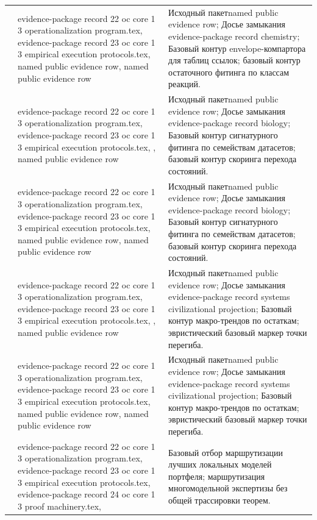 \begin{longtable}{@{}L{0.16\textwidth}L{0.38\textwidth}L{0.34\textwidth}@{}}
 & evidence-package record 22 oc core 1 3 operationalization program.tex, \allowbreak evidence-package record 23 oc core 1 3 empirical execution protocols.tex, named public evidence row, named public evidence row & Исходный пакетnamed public evidence row; Досье замыкания evidence-package record chemistry; Базовый контур envelope-компартора для таблиц ссылок; базовый контур остаточного фитинга по классам реакций. \\
 & evidence-package record 22 oc core 1 3 operationalization program.tex, \allowbreak evidence-package record 23 oc core 1 3 empirical execution protocols.tex, \allowbreak {}, named public evidence row & Исходный пакетnamed public evidence row; Досье замыкания evidence-package record biology; Базовый контур сигнатурного фитинга по семействам датасетов; базовый контур скоринга перехода состояний. \\
 & evidence-package record 22 oc core 1 3 operationalization program.tex, \allowbreak evidence-package record 23 oc core 1 3 empirical execution protocols.tex, named public evidence row, named public evidence row & Исходный пакетnamed public evidence row; Досье замыкания evidence-package record biology; Базовый контур сигнатурного фитинга по семействам датасетов; базовый контур скоринга перехода состояний. \\
 & evidence-package record 22 oc core 1 3 operationalization program.tex, \allowbreak evidence-package record 23 oc core 1 3 empirical execution protocols.tex, \allowbreak {}, named public evidence row & Исходный пакетnamed public evidence row; Досье замыкания evidence-package record systems civilizational projection; Базовый контур макро-трендов по остаткам; эвристический базовый маркер точки перегиба. \\
 & evidence-package record 22 oc core 1 3 operationalization program.tex, \allowbreak evidence-package record 23 oc core 1 3 empirical execution protocols.tex, named public evidence row, named public evidence row & Исходный пакетnamed public evidence row; Досье замыкания evidence-package record systems civilizational projection; Базовый контур макро-трендов по остаткам; эвристический базовый маркер точки перегиба. \\
 & evidence-package record 22 oc core 1 3 operationalization program.tex, \allowbreak evidence-package record 23 oc core 1 3 empirical execution protocols.tex, \allowbreak evidence-package record 24 oc core 1 3 proof machinery.tex, \allowbreak {} & Базовый отбор маршрутизации лучших локальных моделей портфеля; маршрутизация многомодельной экспертизы без общей трассировки теорем. \\
\bottomrule
\end{longtable}

